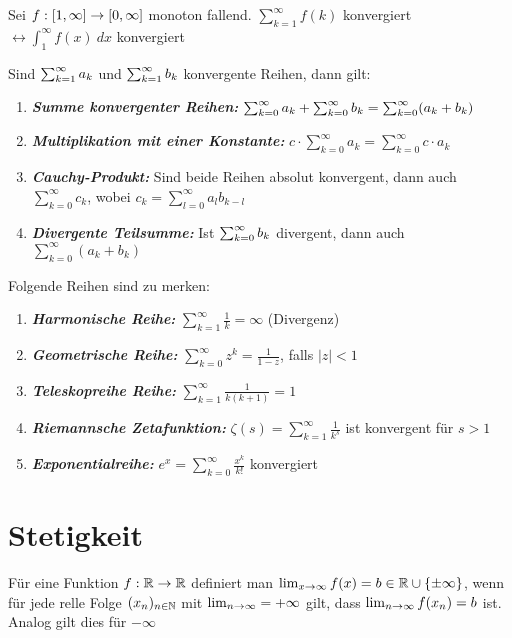\begin{satz}[Integralkriterium]
	Sei $f : [1,\infty] \rightarrow [0, \infty]$ monoton fallend. 	$\sum_{k=1}^{\infty} f(k) $ konvergiert $\leftrightarrow \int_{1}^{\infty} f(x) \medspace dx $ konvergiert
\end{satz}

\begin{satz}
	Sind $\sum_{k = 1}^{\infty} a_{k}$ und $\sum_{k = 1}^{\infty} b_{k}$ konvergente Reihen, dann gilt:
	\begin{enumerate}[noitemsep]
		\item \emph{\textbf{Summe konvergenter Reihen:}} $\sum_{k = 0}^{\infty} a_{k} + \sum_{k = 0}^{\infty} b_{k} = \sum_{k=0}^{\infty} (a_k + b_k)$
		\item \emph{\textbf{Multiplikation mit einer Konstante:}} $c \cdot \sum_{k=0}^{\infty} a_k = \sum_{k=0}^{\infty} c \cdot a_k$
		\item \emph{\textbf{Cauchy-Produkt:}} Sind beide Reihen absolut konvergent, dann auch $\sum_{k=0}^{\infty} c_k$, wobei $c_k = \sum_{l=0}^{\infty} a_lb_{k-l}$
		\item \emph{\textbf{Divergente Teilsumme:}}  Ist $\sum_{k = 0}^{\infty} b_{k}$ divergent, dann auch $\sum_{k=0}^{\infty} (a_k + b_k) $
	\end{enumerate}
\end{satz}

\begin{satz}
	Folgende Reihen sind zu merken:
	\begin{enumerate}[noitemsep]
	\item \emph{\textbf{Harmonische Reihe:}} $\sum_{k=1}^{\infty} \frac{1}{k} = \infty$ (Divergenz)
	\item \emph{\textbf{Geometrische Reihe:}} $\sum_{k=0}^{\infty} z^k = \frac{1}{1 - z}$, falls $|z| < 1$
	\item \emph{\textbf{Teleskopreihe Reihe:}}  $\sum_{k=1}^{\infty} \frac{1}{k(k+1)} = 1$
	\item \emph{\textbf{Riemannsche Zetafunktion:}} $\zeta(s) = \sum_{k=1}^{\infty} \frac{1}{k^s}$ ist konvergent für $s>1$	
	\item \emph{\textbf{Exponentialreihe:}} $e^x = \sum_{k=0}^{\infty} \frac{x^k}{k!}$ konvergiert	
\end{enumerate}
\end{satz}

\section{Stetigkeit}
\begin{definition}
	Für eine Funktion $f : \mathbb{R} \rightarrow \mathbb{R}$ definiert man $\lim_{x \rightarrow \infty} f(x) = b \in \mathbb{R} \cup \{\pm \infty\}$, wenn für jede relle Folge $(x_n)_{n \in \mathbb{N}}$ mit $\lim_{n \rightarrow \infty} = + \infty$ gilt, dass $\lim_{n \rightarrow \infty} f(x_n) = b$ ist. Analog gilt dies für $- \infty$
\end{definition}

